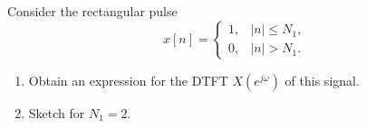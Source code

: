 \begin{frame}
    {
        \begin{figure}
            \centering
            
        \end{figure}

    }
\end{frame}


\begin{frame}
    \begin{example}
        Consider the rectangular pulse
        \begin{equation*}
            x[n] = \begin{cases}
                1, & |n| \leq N_1,\\
                0, & |n| > N_1.
            \end{cases}
        \end{equation*}
        \begin{enumerate}
            \item Obtain an expression for the DTFT $X(e^{j\omega})$ of this signal.
            \item Sketch for $N_1 = 2$.
        \end{enumerate}
     \end{example}

        \begin{figure}
            \centering
            
        \end{figure}

\end{frame}



\begin{frame}

    \begin{figure}
        \centering
        
    \end{figure}
\end{frame}



